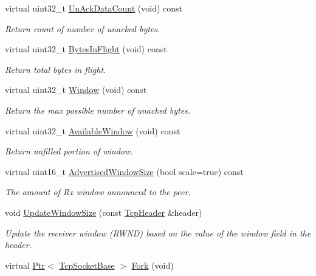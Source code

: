 \begin{DoxyCompactItemize}
virtual uint32\+\_\+t \hyperlink{classns3_1_1TcpSocketBase_aba0c8b002908bfa8cd170b793df747bc}{Un\+Ack\+Data\+Count} (void) const 
\begin{DoxyCompactList}\small\item\em Return count of number of unacked bytes. \end{DoxyCompactList}\item 
virtual uint32\+\_\+t \hyperlink{classns3_1_1TcpSocketBase_ad240f7f16347250ed2c82f1ab2777521}{Bytes\+In\+Flight} (void) const 
\begin{DoxyCompactList}\small\item\em Return total bytes in flight. \end{DoxyCompactList}\item 
virtual uint32\+\_\+t \hyperlink{classns3_1_1TcpSocketBase_a820d022945d4fa0494712d7ed5868091}{Window} (void) const 
\begin{DoxyCompactList}\small\item\em Return the max possible number of unacked bytes. \end{DoxyCompactList}\item 
virtual uint32\+\_\+t \hyperlink{classns3_1_1TcpSocketBase_add825047dd7c82046d42087e29b7c5b7}{Available\+Window} (void) const 
\begin{DoxyCompactList}\small\item\em Return unfilled portion of window. \end{DoxyCompactList}\item 
virtual uint16\+\_\+t \hyperlink{classns3_1_1TcpSocketBase_ae4f307151ccc4d5f5266d2832002df27}{Advertised\+Window\+Size} (bool scale=true) const 
\begin{DoxyCompactList}\small\item\em The amount of Rx window announced to the peer. \end{DoxyCompactList}\item 
void \hyperlink{classns3_1_1TcpSocketBase_aaa81bed04831358d23d50a4ef3a9a6c5}{Update\+Window\+Size} (const \hyperlink{classns3_1_1TcpHeader}{Tcp\+Header} \&header)
\begin{DoxyCompactList}\small\item\em Update the receiver window (R\+W\+ND) based on the value of the window field in the header. \end{DoxyCompactList}\item 
virtual \hyperlink{classns3_1_1Ptr}{Ptr}$<$ \hyperlink{classns3_1_1TcpSocketBase}{Tcp\+Socket\+Base} $>$ \hyperlink{classns3_1_1TcpSocketBase_a991265d824d6e36affef05e1e050c752}{Fork} (void)

\end{DoxyCompactItemize}
